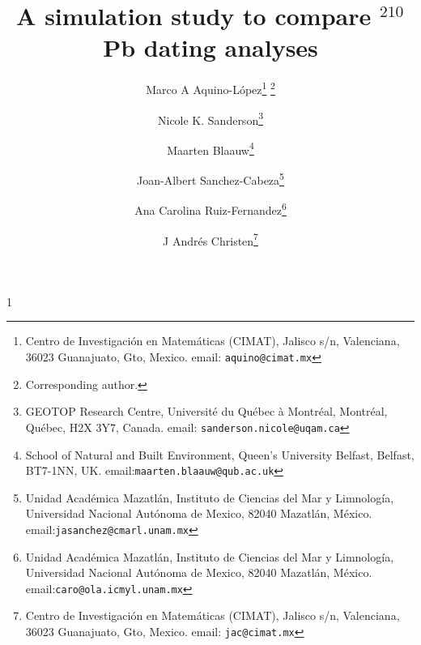 \documentclass [10pt] {article}
\date{ }
\newcommand{\blind}{1}
\newcommand{\papertitle}{
 A simulation study to compare $^{210}$Pb dating analyses 
}
\begin{document}
	\def\spacingset#1{\renewcommand{\baselinestretch}%
		{#1}\small\normalsize} \spacingset{1}
	\blind
	{
		\title{\textbf{\papertitle}}

		\author{Marco A Aquino-L\'opez\thanks{
				Centro de Investigaci\'on en Matem\'aticas (CIMAT),
				Jalisco s/n, Valenciana, 36023 Guanajuato, Gto, Mexico.
				email: \texttt{aquino@cimat.mx} } \thanks{Corresponding author.}
					\and
			Nicole K. Sanderson\thanks{
				GEOTOP Research Centre, Université du Québec à Montréal, 
				Montréal, Québec, H2X 3Y7, Canada. 
				email: \texttt{sanderson.nicole@uqam.ca}}
					\and
			Maarten Blaauw\thanks{School of Natural and Built Environment,
				Queen's University Belfast,
				Belfast, BT7-1NN, UK.
				email:\texttt{maarten.blaauw@qub.ac.uk}  }
					\and
			Joan-Albert Sanchez-Cabeza\thanks{
				Unidad Acad\'emica Mazatl\'an, 
				Instituto de Ciencias del Mar y Limnolog\'ia, 
				Universidad Nacional Aut\'onoma de Mexico, 
				82040 Mazatl\'an, M\'exico.
				email:\texttt{jasanchez@cmarl.unam.mx}} 
					\and
			Ana Carolina Ruiz-Fernandez\thanks{
				Unidad Acad\'emica Mazatl\'an, 
				Instituto de Ciencias del Mar y Limnolog\'ia, 
				Universidad Nacional Aut\'onoma de Mexico, 
				82040 Mazatl\'an, M\'exico.
				email:\texttt{caro@ola.icmyl.unam.mx}} 
					\and
			J Andr\'es Christen\thanks{
				Centro de Investigaci\'on en Matem\'aticas (CIMAT),
				Jalisco s/n, Valenciana, 36023 Guanajuato, Gto, Mexico.
				email: \texttt{jac@cimat.mx}  }
			}
		\maketitle
	} \fi
\end{document}
